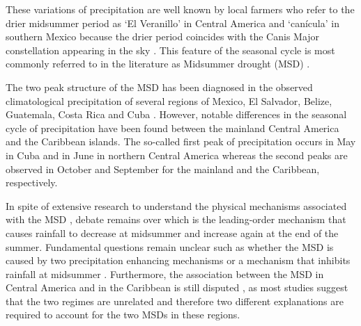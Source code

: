 These variations of precipitation are well known by local farmers who refer to the drier midsummer period as `El Veranillo' in Central America and `can\' icula' in southern Mexico because the drier period  coincides with the Canis Major constellation appearing in the sky \citep{dilley1996}. This feature of the seasonal cycle is most commonly referred to in the literature as Midsummer drought (MSD) \citep{magana1999}. 
%

The two peak structure of the MSD has been diagnosed in the observed climatological precipitation of several regions of Mexico, El Salvador, Belize, Guatemala, Costa Rica and Cuba \citep[e.g.][]{mosino1966,magana1999,duranquesada2017,perdigon2018}.
However, notable differences in the seasonal cycle of precipitation have been found between the mainland Central America and the Caribbean islands. The so-called first peak of precipitation occurs in May in Cuba and in June in northern Central America whereas the second peaks are observed in October and September for the mainland and the Caribbean, respectively. 

 In spite of extensive research to understand the physical mechanisms associated with the MSD   \citep[e.g.][]{magana1999,giannini2000,gamble2008,herrera2015,maldonado2017,straffon2019}, debate remains over which is the leading-order mechanism that causes rainfall to decrease at midsummer and increase again at the end of the summer.  %
Fundamental questions remain unclear such  as whether the MSD is caused by two precipitation enhancing mechanisms \citep{karnauskas2013} or a mechanism that inhibits rainfall at midsummer \citep{duranquesada2017}. 
Furthermore, the association between the MSD in Central America and in the Caribbean is still disputed \citep{gamble2008}, as most studies suggest that the two regimes are unrelated and therefore two different explanations are required to account for the two MSDs in these regions. 

